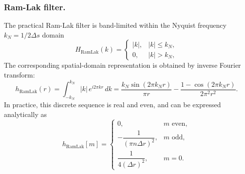 \documentclass[../../../main.tex]{subfiles}
\begin{document}
\subsubsection{Ram-Lak filter.}
The practical Ram-Lak filter is band-limited within the Nyquist frequency $k_N=1/2\Delta s$ domain
\[
    H_{\text{RamLak}}(k) =
    \begin{cases}
        |k|, & |k| \le k_N, \\
        0,   & |k| > k_N,
    \end{cases}
\]
The corresponding spatial-domain representation is obtained by inverse Fourier transform:
\[
    h_{\text{RamLak}}(r) =
    \int_{-k_N}^{k_N} |k|\, e^{i2\pi k r}\, dk
    = \frac{k_N \sin(2\pi k_N r)}{\pi r}
    - \frac{1 - \cos(2\pi k_N r)}{2\pi^2 r^2}.
\]
In practice, this discrete sequence is real and even, and can be expressed analytically as
\[
    h_{\text{RamLak}}[m] =
    \begin{cases}
        0,                             & m \text{ even}, \\
        -\dfrac{1}{(\pi n\Delta r)^2}, & m \text{ odd},  \\
        \dfrac{1}{4(\Delta r)^2},      & m = 0.
    \end{cases}
\]
\end{document}
